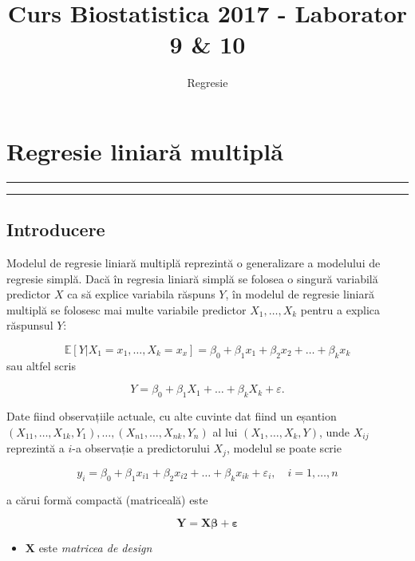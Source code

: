 \documentclass[]{article}
\title{Curs Biostatistica 2017 - Laborator 9 \& 10}
\subtitle{Regresie}
\author{}
\date{}
\providecommand{\tightlist}{%
  \setlength{\itemsep}{0pt}\setlength{\parskip}{0pt}}
\begin{document}
\maketitle

{
\setcounter{tocdepth}{2}
\tableofcontents
}
\section{Regresie liniară multiplă}\label{regresie-liniara-multipla}

\begin{center}\rule{0.5\linewidth}{\linethickness}\end{center}

\begin{center}\rule{0.5\linewidth}{\linethickness}\end{center}

\subsection{Introducere}\label{introducere}

Modelul de regresie liniară multiplă reprezintă o generalizare a
modelului de regresie simplă. Dacă în regresia liniară simplă se folosea
o singură variabilă predictor \(X\) ca să explice variabila răspuns
\(Y\), în modelul de regresie liniară multiplă se folosesc mai multe
variabile predictor \(X_1,\ldots,X_k\) pentru a explica răspunsul \(Y\):

\[
\mathbb{E}[Y|X_1 = x_1, \ldots, X_k=x_x]=\beta_0+\beta_1x_1+\beta_2x_2+\ldots+\beta_kx_k
\] sau altfel scris

\[
Y = \beta_0 + \beta_1 X_1 + \ldots + \beta_k X_k + \varepsilon.
\]

Date fiind observațiile actuale, cu alte cuvinte dat fiind un eșantion
\((X_{11},\ldots,X_{1k},Y_1),\ldots,(X_{n1},\ldots,X_{nk},Y_n)\) al lui
\((X_1,\ldots,X_k,Y)\), unde \(X_{ij}\) reprezintă a \(i\)-a observație
a predictorului \(X_j\), modelul se poate scrie

\[
y_i = \beta_0+\beta_1x_{i1}+\beta_2x_{i2}+\ldots+\beta_kx_{ik}+\varepsilon_i, \quad i = 1,\ldots,n
\]

a cărui formă compactă (matriceală) este

\[
\mathbf{Y}=\mathbf{X}\boldsymbol\beta+\boldsymbol\varepsilon
\]

\begin{itemize}
\tightlist
\item
  \(\mathbf{X}\) este \emph{matricea de design}
\end{itemize}
\end{document}
